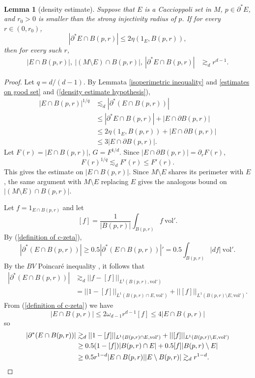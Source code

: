 \documentclass[reqno,12pt,letterpaper]{amsart}
\newcommand{\vol}{\mathrm{vol}}
\newtheorem{lemma}[theorem]{Lemma}
\theoremstyle{definition}
\numberwithin{equation}{section}
\begin{document}
\begin{lemma}[density estimate]\label{uniform density estimate}
Suppose that $E$ is a Caccioppoli set in $M$, $p \in \partial^* E$, and $r_0 > 0$ is smaller than the strong injectivity radius of $p$.
If for every $r \in (0, r_0)$,
\begin{equation}\label{density estimate hypothesis}
|\partial^* E \cap B(p, r)| \leq 2\eta(1_E, B(p, r)),
\end{equation}
then for every such $r$,
\begin{align*}|E \cap B(p, r)|, ~|(M \setminus E) \cap B(p, r)|, ~|\partial^* E \cap B(p, r)| &\gtrsim_d r^{d - 1}.\end{align*}
\end{lemma}
\begin{proof}
Let $q = d/(d-1)$. By Lemmata \ref{isoperimetric inequality} and \ref{estimates on good set} and (\ref{density estimate hypothesis}),
\begin{align*}
|E \cap B(p, r)|^{1/q} &\lesssim_d |\partial^*(E \cap B(p, r))| \\
&\leq |\partial^* E \cap B(p, r)| + |E \cap \partial B(p, r)|\\
&\leq 2\eta(1_E, B(p, r)) +  |E \cap \partial B(p, r)|\\
&\leq 3 |E \cap \partial B(p, r)|.
\end{align*}
Let $F(r) = |E \cap B(p, r)|$, $G = F^{1/d}$.
Since $|E \cap \partial B(p, r)| = \partial_r F(r)$,
$$F(r)^{1/q} \lesssim_d F'(r) \leq F'(r).$$
This gives the estimate on $|E \cap B(p, r)|$.
Since $M \setminus E$ shares its perimeter with $E$, the same argument with $M \setminus E$ replacing $E$ gives the analogous bound on $|(M \setminus E) \cap B(p, r)|$.

Let $f = 1_{E \cap B(p, r)}$ and let
$$[f] = \frac{1}{|B(p, r)|} \int_{B(p, r)} f ~\vol'.$$
By (\ref{definition of c-zeta}),
$$|\partial^* (E \cap B(p, r))| \geq 0.5 |\partial^* (E \cap B(p, r))|' = 0.5 \int_{B(p, r)} |df| ~\vol'.$$
By the $BV$ Poincar\'e inequality \cite[\S5.6.1]{evans1991measure}, it follows that
\begin{align*}
|\partial^* (E \cap B(p, r))| &\gtrsim_d ||f - [f]||_{L^1(B(p, r), \vol')} \\
&= ||1 - [f]||_{L^1(B(p, r) \cap E, \vol')} + ||[f]||_{L^1(B(p, r) \setminus E, \vol')}.
\end{align*}
From (\ref{definition of c-zeta}) we have
$$|E \cap B(p, r)| \leq 2\omega_{d - 1} r^{d - 1} [f] \leq 4|E \cap B(p, r)|$$
so
\begin{align*}
|\partial^* (E \cap B(p, r))| &\gtrsim_d ||1 - [f]||_{L^1(B(p, r) \cap E, \vol')} + ||[f]||_{L^1(B(p, r) \setminus E, \vol')}\\
&\geq 0.5 (1 - [f]) |B(p, r) \cap E| + 0.5 [f] |B(p, r) \setminus E|\\
&\geq 0.5 r^{1-d}|E \cap B(p, r)||E \setminus B(p, r)| \gtrsim_d r^{1 - d}. \qedhere
\end{align*}
\end{proof}
\end{document}
